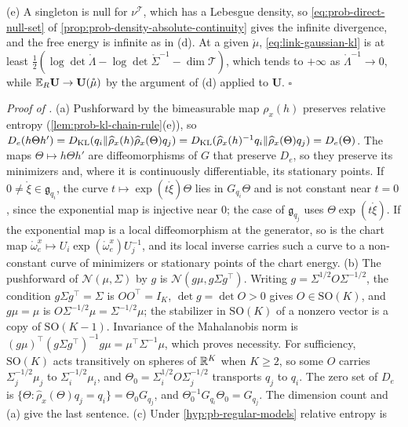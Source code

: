 (e) A singleton is null for $\nu^{\mathscr T}$, which has a Lebesgue density, so
\eqref{eq:prob-direct-null-set} of \cref{prop:prob-density-absolute-continuity} gives the infinite
divergence, and the free energy is infinite as in (d). At a given $\mathring\mu$, \eqref{eq:link-gaussian-kl}
is at least $\frac12(\log\det\mathring\Lambda-\log\det\mathring\Sigma^{-1}-\dim\mathscr T)$, which tends to
$+\infty$ as $\mathring\Lambda^{-1}\to0$, while $\mathbb E_R\mathbf U\to\mathbf U(\mathring\mu)$ by the argument of (d)
applied to $\mathbf U$. \hfill$\square$

\noindent\emph{Proof of .}
(a) Pushforward by the bimeasurable map $\rho_x(h)$ preserves relative entropy
(\cref{lem:prob-kl-chain-rule}(e)), so
$D_e(h\Theta h')=D_{\mathrm{KL}}(q_i\Vert\widehat\rho_x(h)\widehat\rho_x(\Theta)q_j)=D_{\mathrm{KL}}(\widehat\rho_x(h)^{-1}q_i\Vert\widehat\rho_x(\Theta)q_j)=D_e(\Theta)$.
The maps $\Theta\mapsto h\Theta h'$ are diffeomorphisms of $G$ that preserve $D_e$, so they preserve its
minimizers and, where it is continuously differentiable, its stationary points. If $0\neq\mathring\xi\in\mathfrak g_{q_i}$,
the curve $t\mapsto\exp(t\mathring\xi)\Theta$ lies in $G_{q_i}\Theta$ and is not constant near $t=0$, since the exponential
map is injective near $0$; the case of $\mathfrak g_{q_j}$ uses $\Theta\exp(t\mathring\xi)$. If the exponential map is a
local diffeomorphism at the generator, so is the chart map $\mathring\omega^x_e\mapsto U_i\exp(\mathring\omega^x_e)U_j^{-1}$,
and its local inverse carries such a curve to a non-constant curve of minimizers or stationary points of
the chart energy. (b) The pushforward of $\mathcal N(\mu,\Sigma)$ by $g$ is $\mathcal N(g\mu,g\Sigma g^\top)$.
Writing $g=\Sigma^{1/2}O\Sigma^{-1/2}$, the condition $g\Sigma g^\top=\Sigma$ is $OO^\top=I_K$, $\det g=\det O>0$
gives $O\in\mathrm{SO}(K)$, and $g\mu=\mu$ is $O\Sigma^{-1/2}\mu=\Sigma^{-1/2}\mu$; the stabilizer in $\mathrm{SO}(K)$ of a
nonzero vector is a copy of $\mathrm{SO}(K-1)$. Invariance of the Mahalanobis norm is
$(g\mu)^\top(g\Sigma g^\top)^{-1}g\mu=\mu^\top\Sigma^{-1}\mu$, which proves necessity. For sufficiency, $\mathrm{SO}(K)$ acts
transitively on spheres of $\mathbb R^K$ when $K\geq2$, so some $O$ carries $\Sigma_j^{-1/2}\mu_j$ to
$\Sigma_i^{-1/2}\mu_i$, and $\Theta_0=\Sigma_i^{1/2}O\Sigma_j^{-1/2}$ transports $q_j$ to $q_i$. The zero set of
$D_e$ is $\{\Theta:\widehat\rho_x(\Theta)q_j=q_i\}=\Theta_0G_{q_j}$, and $\Theta_0^{-1}G_{q_i}\Theta_0=G_{q_j}$. The
dimension count and (a) give the last sentence. (c) Under \cref{hyp:pb-regular-models} relative entropy is
